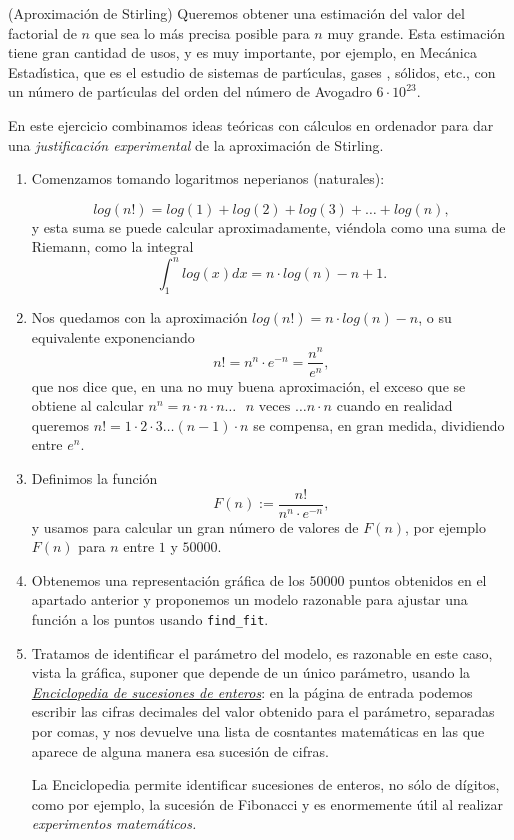 \begin{ejer} 

({\sc Aproximaci\'on de Stirling}) Queremos obtener una
estimaci\'on del valor del factorial de $n$ que sea lo m\'as precisa posible
para $n$ muy grande. Esta estimaci\'on tiene gran cantidad de usos, y es muy
importante, por ejemplo, en Mec\'anica Estad\'{\i}stica,  que es el estudio de
sistemas de part\'{\i}culas, gases , s\'olidos, etc., con un n\'umero de
part\'{\i}culas del orden del n\'umero de Avogadro  $6\cdot 10^23.$
 
 En este ejercicio combinamos ideas te\'oricas con c\'alculos en ordenador para
dar una {\itshape justificaci\'on experimental} de la aproximaci\'on de
Stirling.

\begin{enumerate}
 \item Comenzamos tomando logaritmos neperianos (naturales):
 
 \[log(n!)=log(1)+log(2)+log(3)+\dots+log(n),\]
 \noindent y esta suma se puede calcular aproximadamente, vi\'endola como una
suma de Riemann, como la  integral 
\[\int_1^n log(x)dx=n\cdot log(n)-n+1.\]

\item Nos quedamos con la aproximaci\'on $log(n!)=n\cdot log(n)-n$, o su
equivalente exponenciando
\[n!=n^n\cdot e^{-n}=\frac{n^n}{e^n},\]
\noindent que nos dice que, en una no muy buena aproximaci\'on, el exceso que
se obtiene al calcular $n^n=n\cdot n\cdot n\dots \text{ $n$ veces }\dots n\cdot
n$ cuando en realidad queremos $n!=1\cdot 2\cdot 3\dots (n-1)\cdot n$ se
compensa, en gran medida,  dividiendo entre $e^n$.

\item Definimos la funci\'on 
\[F(n):=\frac{n!}{n^n\cdot e^{-n}},\]
\noindent y usamos {\sage} para calcular un gran n\'umero de valores de $F(n)$,
por ejemplo $F(n)$ para $n$ entre $1$ y $50000$.

\item Obtenemos una representaci\'on gr\'afica de los $50000$ puntos obtenidos
en el apartado anterior y proponemos un modelo razonable para ajustar una
funci\'on a los puntos usando \lstinline|find_fit|.
\label{stirling}
\item Tratamos de identificar el par\'ametro del modelo, es razonable en este
caso, vista la gr\'afica,  suponer que depende de un \'unico par\'ametro, usando
la
\href{https://oeis.org/}{{\itshape  Enciclopedia de sucesiones de enteros}}: en
la p\'agina de entrada podemos escribir las cifras decimales del valor obtenido
para el par\'ametro, separadas por comas, y nos devuelve una lista de
cosntantes matem\'aticas en las que aparece de alguna manera esa sucesi\'on de
cifras. 

La Enciclopedia permite identificar sucesiones  de enteros, no
s\'olo de d\'igitos, como por ejemplo, la sucesi\'on de Fibonacci y es
enormemente \'util al realizar {\itshape experimentos matem\'aticos.}
\end{enumerate}


 
 
 
 \end{ejer}